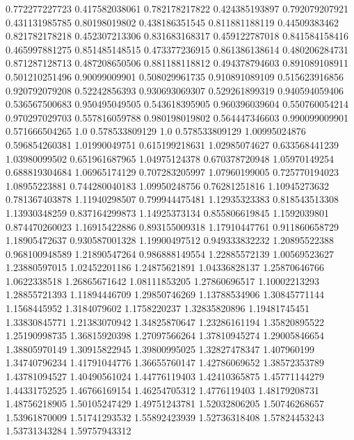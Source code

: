  0.772277227723   0.417582038061
 0.782178217822   0.424385193897
 0.792079207921   0.431131985785
  0.80198019802   0.438186351545
 0.811881188119    0.44509383462
 0.821782178218   0.452307213306
 0.831683168317   0.459122787018
 0.841584158416   0.465997881275
 0.851485148515   0.473377236915
 0.861386138614   0.480206284731
 0.871287128713   0.487208650506
 0.881188118812   0.494378794603
 0.891089108911   0.501210251496
  0.90099009901   0.508029961735
 0.910891089109   0.515623916856
 0.920792079208    0.52242856393
 0.930693069307   0.529261899319
 0.940594059406   0.536567500683
 0.950495049505   0.543618395905
 0.960396039604   0.550760054214
 0.970297029703   0.557816059788
 0.980198019802   0.564447346603
 0.990099009901   0.571666504265
            1.0   0.578533809129
            1.0   0.578533809129
  1.00995024876   0.596854260381
  1.01990049751   0.615199218631
  1.02985074627   0.633568441239
  1.03980099502   0.651961687965
  1.04975124378   0.670378720948
  1.05970149254   0.688819304684
  1.06965174129   0.707283205997
  1.07960199005   0.725770194023
  1.08955223881   0.744280040183
  1.09950248756    0.76281251816
  1.10945273632   0.781367403878
  1.11940298507   0.799944475481
  1.12935323383   0.818543513308
  1.13930348259   0.837164299873
  1.14925373134   0.855806619845
   1.1592039801   0.874470260023
  1.16915422886   0.893155009318
  1.17910447761   0.911860658729
  1.18905472637   0.930587001328
  1.19900497512   0.949333832232
  1.20895522388   0.968100948589
  1.21890547264   0.986888149554
  1.22885572139    1.00569523627
  1.23880597015    1.02452201186
  1.24875621891    1.04336828137
  1.25870646766     1.0622338518
  1.26865671642    1.08111853205
  1.27860696517    1.10002213293
  1.28855721393    1.11894446709
  1.29850746269    1.13788534906
  1.30845771144     1.1568445952
   1.3184079602     1.1758220237
  1.32835820896    1.19481745451
  1.33830845771    1.21383070942
  1.34825870647    1.23286161194
  1.35820895522    1.25190998735
  1.36815920398    1.27097566264
  1.37810945274    1.29005846654
  1.38805970149    1.30915822945
  1.39800995025    1.32827478347
    1.407960199    1.34740796234
  1.41791044776    1.36655760147
  1.42786069652    1.38572353789
  1.43781094527    1.40490561024
  1.44776119403    1.42410365875
  1.45771144279    1.44331752525
  1.46766169154    1.46254705312
   1.4776119403    1.48179208731
  1.48756218905    1.50105247429
  1.49751243781    1.52032806205
  1.50746268657    1.53961870009
  1.51741293532    1.55892423939
  1.52736318408    1.57824453243
  1.53731343284    1.59757943312
